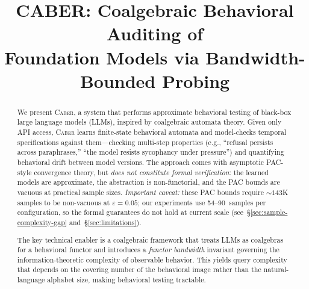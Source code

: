 \documentclass[11pt]{article}
\title{\textbf{CABER: Coalgebraic Behavioral Auditing of\\Foundation Models via Bandwidth-Bounded Probing}}
\author{}
\date{}
\newcommand{\tool}{\textsc{Caber}}
\begin{document}
\maketitle

\begin{abstract}
We present \tool{}, a system that performs approximate behavioral
testing of black-box large language models (LLMs), inspired by
coalgebraic automata theory.  Given only API access, \tool{} learns
finite-state behavioral automata and model-checks temporal
specifications against them---checking multi-step properties
(e.g., ``refusal persists across paraphrases,'' ``the model resists
sycophancy under pressure'') and quantifying behavioral drift between
model versions.  The approach comes with asymptotic PAC-style
convergence theory, but \emph{does not constitute formal verification}:
the learned models are approximate, the abstraction is non-functorial,
and the PAC bounds are vacuous at practical sample sizes.
\emph{Important caveat:} these PAC bounds require ${\sim}143$K samples
to be non-vacuous at $\varepsilon{=}0.05$; our experiments use 54--90~samples
per configuration, so the formal guarantees do not hold at current scale
(see~\S\ref{sec:sample-complexity-gap} and~\S\ref{sec:limitations}).

The key technical enabler is a coalgebraic framework that treats LLMs
as coalgebras for a behavioral functor and introduces a \emph{functor
bandwidth} invariant governing the information-theoretic complexity of
observable behavior.  This yields query complexity that depends on the
covering number of the behavioral image rather than the
natural-language alphabet size, making behavioral testing tractable.


\end{abstract}
\end{document}

